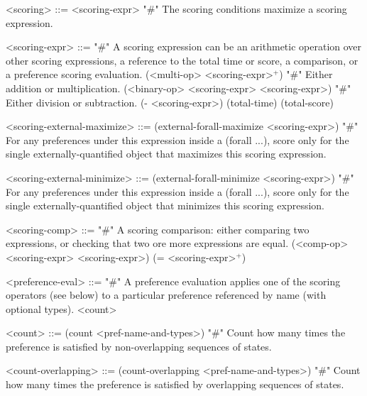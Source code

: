 \documentclass{article}
\begin{document}
\begin{grammar}
<scoring> ::= <scoring-expr> "#" The scoring conditions maximize a scoring expression.

<scoring-expr> ::= "#" A scoring expression can be an arithmetic operation over other scoring expressions, a reference to the total time or score, a comparison, or a preference scoring evaluation.
        \alt (<multi-op> <scoring-expr>$^+$) "#" Either addition or multiplication.
        \alt (<binary-op> <scoring-expr> <scoring-expr>) "#" Either division or subtraction.
        \alt (- <scoring-expr>)
        \alt (total-time)
        \alt (total-score)



<scoring-external-maximize> ::= (external-forall-maximize <scoring-expr>) "#" For any preferences under this expression inside a (forall ...), score only for the single externally-quantified object that maximizes this scoring expression.


<scoring-external-minimize> ::= (external-forall-minimize <scoring-expr>) "#" For any preferences under this expression inside a (forall ...), score only for the single externally-quantified object that minimizes this scoring expression.


<scoring-comp> ::=  "#" A scoring comparison: either comparing two expressions, or checking that two ore more expressions are equal.
        \alt (<comp-op> <scoring-expr> <scoring-expr>)
        \alt (= <scoring-expr>$^+$)


<preference-eval> ::= "#" A preference evaluation applies one of the scoring operators (see below) to a particular preference referenced by name (with optional types).
        \alt <count>



<count> ::= (count <pref-name-and-types>) "#" Count how many times the preference is satisfied by non-overlapping sequences of states.

<count-overlapping> ::= (count-overlapping <pref-name-and-types>) "#" Count how many times the preference is satisfied by overlapping sequences of states.


\end{grammar}
\end{document}
